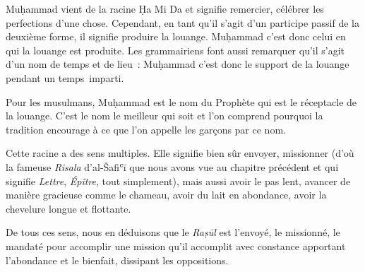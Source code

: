 Muḥammad vient de la racine Ḥa Mi Da et signifie remercier, célébrer les
perfections d'une chose. Cependant, en tant qu'il s'agit d'un participe
passif de la deuxième forme, il signifie produire la louange. Muḥammad
c'est donc celui en qui la louange est produite. Les grammairiens font
aussi remarquer qu'il s'agit d'un nom de temps et de lieu~: Muḥammad
c'est donc le support de la louange pendant un temps~imparti.

Pour les musulmans, Muḥammad est le nom du Prophète qui est le
réceptacle de la louange. C'est le nom le meilleur qui soit et l'on
comprend pourquoi la tradition encourage à ce que l'on appelle les
garçons par ce nom.


Cette racine a des sens multiples. Elle signifie bien sûr envoyer,
missionner (d'où la fameuse \emph{Risala} d'al-Šafiʿī que nous avons vue
au chapitre précédent et qui signifie \emph{Lettre}, \emph{Épître}, tout
simplement), mais aussi avoir le pas lent, avancer de manière gracieuse
comme le chameau, avoir du lait en abondance, avoir la chevelure longue
et flottante.

De tous ces sens, nous en déduisons que le \emph{Raṣūl} est l'envoyé, le
missionné, le mandaté pour accomplir une mission qu'il accomplit avec
constance apportant l'abondance et le bienfait, dissipant les
oppositions.


